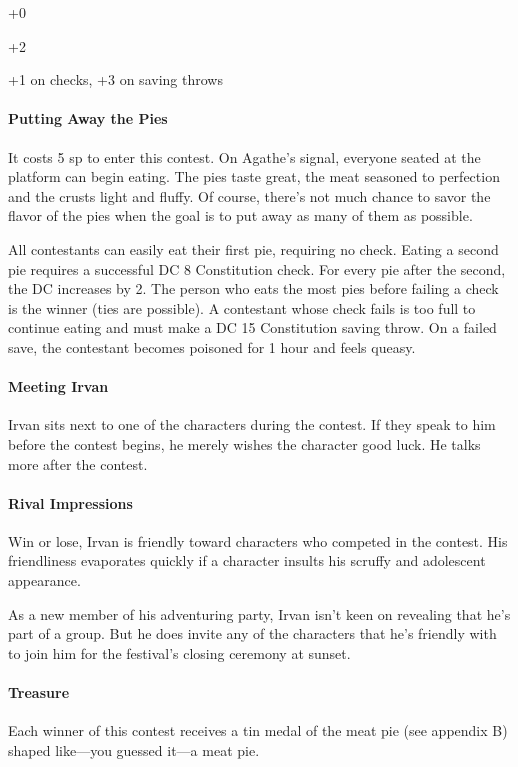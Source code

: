\documentclass[10pt,a4paper,twoside,twocolumn,openany,nodeprecatedcode]{dndbook}
\begin{document}
\begin{description}[nolistsep]
\item[Male Drow:]
+0
\item[Female Halfling:]
+2
\item[Irvan Wastewalker:]
+1 on checks, +3 on saving throws
\end{description}

\paragraph{Putting Away the Pies}
It costs 5 sp to enter this contest. On Agathe's signal, everyone seated at the platform can begin eating. The pies taste great, the meat seasoned to perfection and the crusts light and fluffy. Of course, there's not much chance to savor the flavor of the pies when the goal is to put away as many of them as possible.

All contestants can easily eat their first pie, requiring no check. Eating a second pie requires a successful DC 8 Constitution check. For every pie after the second, the DC increases by 2. The person who eats the most pies before failing a check is the winner (ties are possible). A contestant whose check fails is too full to continue eating and must make a DC 15 Constitution saving throw. On a failed save, the contestant becomes poisoned for 1 hour and feels queasy.

\paragraph{Meeting Irvan}
Irvan sits next to one of the characters during the contest. If they speak to him before the contest begins, he merely wishes the character good luck. He talks more after the contest.

\paragraph{Rival Impressions}
Win or lose, Irvan is friendly toward characters who competed in the contest. His friendliness evaporates quickly if a character insults his scruffy and adolescent appearance.

As a new member of his adventuring party, Irvan isn't keen on revealing that he's part of a group. But he does invite any of the characters that he's friendly with to join him for the festival's closing ceremony at sunset.

\paragraph{Treasure}
Each winner of this contest receives a tin medal of the meat pie (see appendix B) shaped like—you guessed it—a meat pie.
\end{document}
